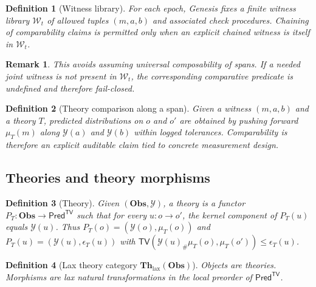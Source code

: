 \documentclass[11pt,a4paper]{article}
\newtheorem{definition}{Definition}[section]
\newtheorem{remark}{Remark}[section]
\newcommand{\Obs}{\mathbf{Obs}}
\newcommand{\Th}{\mathbf{Th}}
\newcommand{\TV}{\mathsf{TV}}
\begin{document}
\begin{definition}[Witness library]
For each epoch, Genesis fixes a finite witness library $\mathcal{W}_t$ of allowed tuples $(m,a,b)$ and associated check procedures.
Chaining of comparability claims is permitted only when an explicit chained witness is itself in $\mathcal{W}_t$.
\end{definition}

\begin{remark}
This avoids assuming universal composability of spans.
If a needed joint witness is not present in $\mathcal{W}_t$, the corresponding comparative predicate is undefined and therefore fail-closed.
\end{remark}
\begin{definition}[Theory comparison along a span]
Given a witness $(m,a,b)$ and a theory $T$, predicted distributions on $o$ and $o'$ are obtained by pushing forward $\mu_T(m)$ along $\mathcal{Y}(a)$ and $\mathcal{Y}(b)$ within logged tolerances.
Comparability is therefore an explicit auditable claim tied to concrete measurement design.
\end{definition}

\subsection{Theories and theory morphisms}
\begin{definition}[Theory]
Given $(\Obs,\mathcal{Y})$, a theory is a functor $P_T:\Obs\to \mathsf{Pred}^{\TV}$ such that for every $u:o\to o'$, the kernel component of $P_T(u)$ equals $\mathcal{Y}(u)$.
Thus $P_T(o)=(\mathcal{Y}(o),\mu_T(o))$ and $P_T(u)=(\mathcal{Y}(u),\epsilon_T(u))$ with
$\TV(\mathcal{Y}(u)_\#\mu_T(o),\mu_T(o'))\le \epsilon_T(u)$.
\end{definition}

\begin{definition}[Lax theory category $\Th_{\mathrm{lax}}(\Obs)$]
Objects are theories.
Morphisms are \emph{lax} natural transformations in the local preorder of $\mathsf{Pred}^{\TV}$.
\end{definition}
\end{document}
